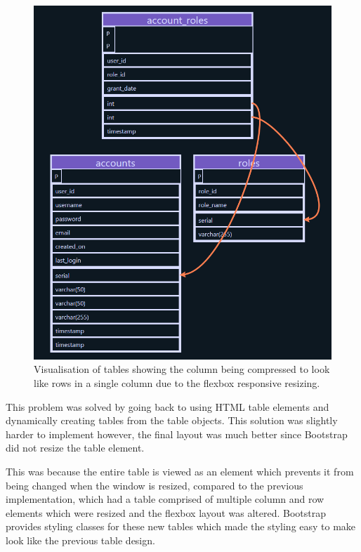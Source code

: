 \begin{figure}[h!]
	\centering
	\includegraphics[scale=0.5]{postSquash}
	\caption{Visualisation of tables showing the column being compressed to look like rows in a single column due to the flexbox responsive resizing.}
	\label{fig:squash}
\end{figure}

This problem was solved by going back to using HTML table elements and dynamically creating tables from the table objects. This solution was slightly harder to implement however, the final layout was much better since Bootstrap did not resize the table element. 

This was because the entire table is viewed as an element which prevents it from being changed when the window is resized, compared to the previous implementation, which had a table comprised of multiple column and row elements which were resized and the flexbox layout was altered. Bootstrap provides styling classes for these new tables which made the styling easy to make look like the previous table design.

